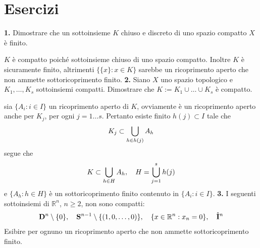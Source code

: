 \documentclass[oneside, 11pt]{amsbook}
\makeatletter
\newcommand{\0}{{(0)}}
\newcommand{\3}{{(3)}}
\theoremstyle{colonplain}
\theoremstyle{colondefinition}
\theoremstyle{colonremark}
\numberwithin{equation}{chapter}
\renewcommand{\proofname}{Dimostrazione}
\renewenvironment{proof}[1][\proofname]{\par
  \pushQED{\qed}%
  \normalfont \topsep6\p@\@plus6\p@\relax
  \trivlist
  \item[\hskip\labelsep\bfseries #1:]\ignorespaces
}{%
  \popQED\endtrivlist\@endpefalse
}
\makeatother
\begin{document}
\section{Esercizi}
\textbf{1.} Dimostrare che un sottoinsieme $K$ chiuso e discreto di uno spazio compatto $X$ è finito.
\begin{proof}
$K$ è compatto poiché sottoinsieme chiuso di uno spazio compatto. Inoltre $K$ è sicuramente finito, altrimenti $\{ \{ x \} : x \in K \}$ sarebbe un ricoprimento aperto che non ammette sottoricoprimento finito.
\end{proof}
\textbf{2.} Siano $X$ uno spazio topologico e $K_1, \dots, K_s$ sottoinsiemi compatti. Dimostrare che $K := K_1 \cup \dots \cup K_s$ è compatto.
\begin{proof}
sia $\{ A_i : i \in I \}$ un ricoprimento aperto di $K$, ovviamente è un ricoprimento aperto anche per $K_j$, per ogni $j = 1 \dots s$. Pertanto esiste finito $h(j) \subset I$ tale che
\begin{align}
    K_j \subset \bigcup_{h \in h(j)} A_h \notag
\end{align}
segue che
\begin{align}
    K \subset \bigcup_{h \in H} A_h, \quad H = \bigcup_{j = 1}^s h(j) \notag
\end{align}
e $\{ A_h : h \in H \}$ è un sottoricoprimento finito contenuto in $\{ A_i : i \in I \}$.
\end{proof}
\textbf{3.} I seguenti sottoinsiemi di $\mathbb{R}^n$, $n \geq 2$, non sono compatti:
\begin{align}
    \mathbf{D}^n \setminus \{ 0 \}, \quad \mathbf{S}^{n - 1} \setminus \{ (1, 0, \dots, 0) \}, \quad \{ x \in \mathbb{R}^n : x_n = 0 \}, \quad \mathring{\mathbf{I}}^n \notag
\end{align}
Esibire per ognuno un ricoprimento aperto che non ammette sottoricoprimento finito.
\end{document}
